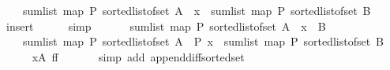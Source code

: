 \begin{isabellebody}
\ \ \ \ sum{\isacharunderscore}{\kern0pt}list\ {\isacharparenleft}{\kern0pt}map\ P\ {\isacharparenleft}{\kern0pt}sorted{\isacharunderscore}{\kern0pt}list{\isacharunderscore}{\kern0pt}of{\isacharunderscore}{\kern0pt}set\ {\isacharparenleft}{\kern0pt}A\ {\isacharminus}{\kern0pt}\ {\isacharbraceleft}{\kern0pt}x{\isacharbraceright}{\kern0pt}{\isacharparenright}{\kern0pt}{\isacharparenright}{\kern0pt}{\isacharparenright}{\kern0pt}\ {\isacharminus}{\kern0pt}\ sum{\isacharunderscore}{\kern0pt}list\ {\isacharparenleft}{\kern0pt}map\ P\ {\isacharparenleft}{\kern0pt}sorted{\isacharunderscore}{\kern0pt}list{\isacharunderscore}{\kern0pt}of{\isacharunderscore}{\kern0pt}set\ B{\isacharparenright}{\kern0pt}{\isacharparenright}{\kern0pt}{\isachardoublequoteclose}\isanewline
\ \ \ \ \isamarkupfalse%
\ insert{\isacharparenleft}{\kern0pt}{}{\isacharparenright}{\kern0pt}\isanewline
\ \ \ \ \isamarkupfalse%
\ simp\ \isanewline
\ \ \isamarkupfalse%
\ \isamarkupfalse%
\ {\isachardoublequoteopen}sum{\isacharunderscore}{\kern0pt}list\ {\isacharparenleft}{\kern0pt}map\ P\ {\isacharparenleft}{\kern0pt}sorted{\isacharunderscore}{\kern0pt}list{\isacharunderscore}{\kern0pt}of{\isacharunderscore}{\kern0pt}set\ {\isacharparenleft}{\kern0pt}{\isacharparenleft}{\kern0pt}A\ {\isacharminus}{\kern0pt}\ {\isacharbraceleft}{\kern0pt}x{\isacharbraceright}{\kern0pt}{\isacharparenright}{\kern0pt}\ {\isacharminus}{\kern0pt}\ B{\isacharparenright}{\kern0pt}{\isacharparenright}{\kern0pt}{\isacharparenright}{\kern0pt}\ {\isacharequal}{\kern0pt}\isanewline
\ \ \ \ sum{\isacharunderscore}{\kern0pt}list\ {\isacharparenleft}{\kern0pt}map\ P\ {\isacharparenleft}{\kern0pt}sorted{\isacharunderscore}{\kern0pt}list{\isacharunderscore}{\kern0pt}of{\isacharunderscore}{\kern0pt}set\ {\isacharparenleft}{\kern0pt}A{\isacharparenright}{\kern0pt}{\isacharparenright}{\kern0pt}{\isacharparenright}{\kern0pt}\ {\isacharminus}{\kern0pt}\ P\ x\ {\isacharminus}{\kern0pt}\ sum{\isacharunderscore}{\kern0pt}list\ {\isacharparenleft}{\kern0pt}map\ P\ {\isacharparenleft}{\kern0pt}sorted{\isacharunderscore}{\kern0pt}list{\isacharunderscore}{\kern0pt}of{\isacharunderscore}{\kern0pt}set\ B{\isacharparenright}{\kern0pt}{\isacharparenright}{\kern0pt}{\isachardoublequoteclose}\isanewline
\ \ \ \ \isamarkupfalse%
\ xA\ ff\ \isanewline
\ \ \ \ \isamarkupfalse%
\ {\isacharparenleft}{\kern0pt}simp\ add{\isacharcolon}{\kern0pt}\ append{\isacharunderscore}{\kern0pt}diff{\isacharunderscore}{\kern0pt}sorted{\isacharunderscore}{\kern0pt}set{\isacharparenright}{\kern0pt}\ \isanewline

\end{isabellebody}
